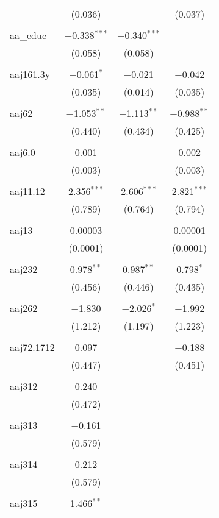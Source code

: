 \begin{table}[!htbp]
\begin{tabular}{@{\extracolsep{5pt}}lccc}
  & (0.036) &  & (0.037) \\ 
  & & & \\ 
 aa\_educ & $-$0.338$^{***}$ & $-$0.340$^{***}$ &  \\ 
  & (0.058) & (0.058) &  \\ 
  & & & \\ 
 aaj161.3y & $-$0.061$^{*}$ & $-$0.021 & $-$0.042 \\ 
  & (0.035) & (0.014) & (0.035) \\ 
  & & & \\ 
 aaj62 & $-$1.053$^{**}$ & $-$1.113$^{**}$ & $-$0.988$^{**}$ \\ 
  & (0.440) & (0.434) & (0.425) \\ 
  & & & \\ 
 aaj6.0 & 0.001 &  & 0.002 \\ 
  & (0.003) &  & (0.003) \\ 
  & & & \\ 
 aaj11.12 & 2.356$^{***}$ & 2.606$^{***}$ & 2.821$^{***}$ \\ 
  & (0.789) & (0.764) & (0.794) \\ 
  & & & \\ 
 aaj13 & 0.00003 &  & 0.00001 \\ 
  & (0.0001) &  & (0.0001) \\ 
  & & & \\ 
 aaj232 & 0.978$^{**}$ & 0.987$^{**}$ & 0.798$^{*}$ \\ 
  & (0.456) & (0.446) & (0.435) \\ 
  & & & \\ 
 aaj262 & $-$1.830 & $-$2.026$^{*}$ & $-$1.992 \\ 
  & (1.212) & (1.197) & (1.223) \\ 
  & & & \\ 
 aaj72.1712 & 0.097 &  & $-$0.188 \\ 
  & (0.447) &  & (0.451) \\ 
  & & & \\ 
 aaj312 & 0.240 &  &  \\ 
  & (0.472) &  &  \\ 
  & & & \\ 
 aaj313 & $-$0.161 &  &  \\ 
  & (0.579) &  &  \\ 
  & & & \\ 
 aaj314 & 0.212 &  &  \\ 
  & (0.579) &  &  \\ 
  & & & \\ 
 aaj315 & 1.466$^{**}$ &  &  \\ 

\end{tabular}
\end{table}
